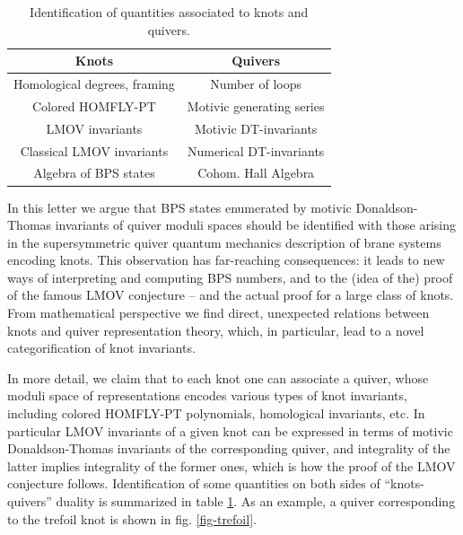 \documentclass[
 reprint,
 amsmath,amssymb,
 aps,prl
]{revtex4-1}
\begin{document}
\begin{table}
\begin{tabular}{c|c}
{\bf Knots} & {\bf Quivers} \\
\hline
Homological degrees, framing & Number of loops \\
Colored HOMFLY-PT & Motivic generating series \\
LMOV invariants & Motivic DT-invariants \\
Classical LMOV invariants & Numerical DT-invariants \\
Algebra of BPS states & Cohom. Hall Algebra \\
\end{tabular}
\caption{Identification of quantities associated to knots and quivers.}  \label{tab-duality}
\end{table}

In this letter we argue that BPS states enumerated by motivic Donaldson-Thomas invariants of quiver moduli spaces should be identified with those arising in the supersymmetric quiver quantum mechanics description of brane systems encoding knots. 
This observation has far-reaching consequences: it leads to new ways of interpreting and computing BPS numbers, and to the (idea of the) proof of the famous LMOV conjecture -- and the actual proof for a large class of knots. From mathematical perspective we find direct, unexpected relations between knots and quiver representation theory, which, in particular, lead to a novel categorification of knot invariants. 

In more detail, we claim that to each knot one can associate a quiver, whose moduli space of representations encodes various types of knot invariants, including colored HOMFLY-PT polynomials, homological invariants, etc. In particular LMOV invariants of a given knot can be expressed in terms of motivic Donaldson-Thomas invariants of the corresponding quiver, and integrality of the latter implies integrality of the former ones, which is how the proof of the LMOV conjecture follows.  %
Identification of some quantities on both sides of ``knots-quivers'' duality is summarized in table \ref{tab-duality}. As an example, a quiver corresponding to the trefoil knot is shown in fig. \ref{fig-trefoil}.
\end{document}

